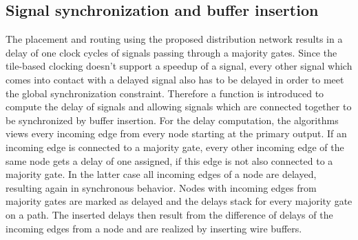 \subsection{Signal synchronization and buffer insertion}
The placement and routing using the proposed distribution network results in a delay of one clock cycles of signals passing through a majority gates. Since the tile-based clocking doesn't support a speedup of a signal, every other signal which comes into contact with a delayed signal also has to be delayed in order to meet the global synchronization constraint. Therefore a function is introduced to compute the delay of signals and allowing signals which are connected together to be synchronized by buffer insertion. For the delay computation, the algorithms views every incoming edge from every node starting at the primary output. If an incoming edge is connected to a majority gate, every other incoming edge of the same node gets a delay of one assigned, if this edge is not also connected to a majority gate. In the latter case all incoming edges of a node are delayed, resulting again in synchronous behavior. Nodes with incoming edges from majority gates are marked as delayed and the delays stack for every majority gate on a path. The inserted delays then result from the difference of delays of the incoming edges from a node and are realized by inserting wire buffers. 


